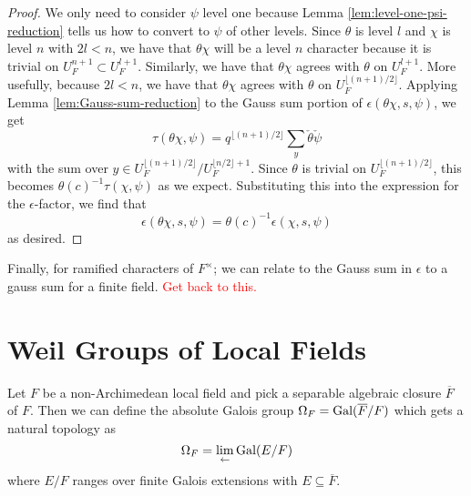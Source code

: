 \begin{proof}
  We only need to consider $\psi$ level one because Lemma \ref{lem:level-one-psi-reduction} tells us how to convert to $\psi$ of other levels.
  Since $\theta$ is level $l$ and $\chi$ is level $n$ with $2l < n$, we have that $\theta\chi$ will be a level $n$ character because it is trivial on $U_F^{n+1} \subset U_F^{l+1}$.
  Similarly, we have that $\theta \chi$ agrees with $\theta$ on $U_F^{l+1}$.
  More usefully, because $2l < n$, we have that $\theta \chi$ agrees with $\theta$ on $U_F^{\lfloor (n+1)/2 \rfloor}$.
  Applying Lemma \ref{lem:Gauss-sum-reduction} to the Gauss sum portion of $\epsilon(\theta\chi,s,\psi)$, we get
  \[\tau(\theta \chi, \psi) = q^{\lfloor (n+1)/2\rfloor} \sum_y \check{\theta}\check{\psi}\]
  with the sum over $y \in U_F^{\lfloor (n+1)/2 \rfloor}/U_F^{\lfloor n/2 \rfloor + 1}$.
  Since $\theta$ is trivial on $U_F^{\lfloor (n+1)/2 \rfloor}$, this becomes $\theta(c)^{-1} \tau(\chi, \psi)$ as we expect.
  Substituting this into the expression for the $\epsilon$-factor, we find that
  \[\epsilon(\theta\chi, s, \psi) = \theta(c)^{-1} \epsilon(\chi, s, \psi)\]
  as desired.
\end{proof}

Finally, for ramified characters of $F^\times$; we can relate to the Gauss sum in $\epsilon$ to a gauss sum for a finite field.
\textcolor{red}{Get back to this.}
\section{Weil Groups of Local Fields}
\label{sec:weil-group}
Let $F$ be a non-Archimedean local field and pick a separable algebraic closure $\overline{F}$ of $F$.
Then we can define the absolute Galois group $\Omega_F = \textrm{Gal}(\overline{F}/F)$ which gets a natural topology as
\[\Omega_F = \lim_{\leftarrow} \textrm{Gal}(E/F)\]
where $E/F$ ranges over finite Galois extensions with $E \subseteq \overline{F}$.

